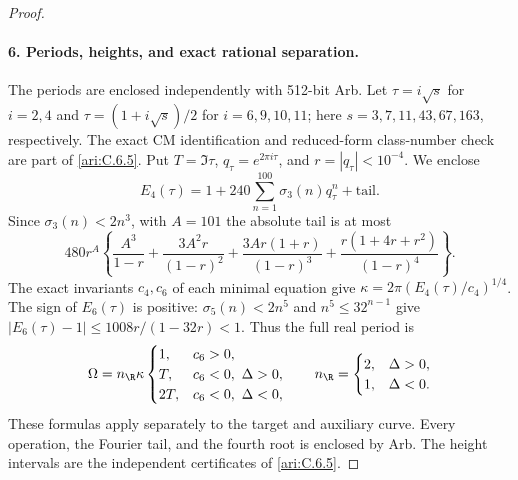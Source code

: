 \begin{proof}
\paragraph{6. Periods, heights, and exact rational separation.}
The periods are enclosed independently with 512-bit Arb. Let
$\tau=i\sqrt s$ for $i=2,4$ and
$\tau=(1+i\sqrt s)/2$ for $i=6,9,10,11$; here
$s=3,7,11,43,67,163$, respectively. The exact CM identification
and reduced-form class-number check are part of \ref{ari:C.6.5}. Put
$T=\Im\tau$, $q_\tau=e^{2\pi i\tau}$, and
$r=|q_\tau|<10^{-4}$. We enclose
\[
 E_4(\tau)=1+240\sum_{n=1}^{100}\sigma_3(n)q_\tau^n
                   +\text{tail}.
\]
Since $\sigma_3(n)<2n^3$, with $A=101$ the absolute tail is at most
\[
 480r^A\left\{
 \frac{A^3}{1-r}+\frac{3A^2r}{(1-r)^2}
 +\frac{3Ar(1+r)}{(1-r)^3}
 +\frac{r(1+4r+r^2)}{(1-r)^4}\right\}.
\]
The exact invariants $c_4,c_6$ of each minimal equation give
$\kappa=2\pi(E_4(\tau)/c_4)^{1/4}$. The sign of $E_6(\tau)$
is positive: $\sigma_5(n)<2n^5$ and
$n^5\leq32^{n-1}$ give
$|E_6(\tau)-1|\leq1008r/(1-32r)<1$.
Thus the full real period is
\[
 \Omega=n_{\R}\kappa\begin{cases}
 1,&c_6>0,\\
 T,&c_6<0,\ \Delta>0,\\
 2T,&c_6<0,\ \Delta<0,
 \end{cases}
 \qquad n_{\R}=\begin{cases}2,&\Delta>0,\\1,&\Delta<0.\end{cases}
\]
These formulas apply separately to the target and auxiliary curve.
Every operation, the Fourier tail, and the fourth root is enclosed
by Arb. The height intervals are the independent certificates
 of \ref{ari:C.6.5}.


\end{proof}
